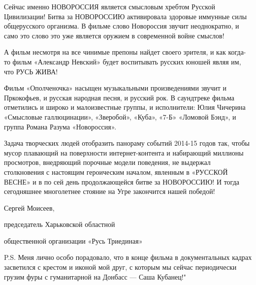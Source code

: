 Сейчас именно НОВОРОССИЯ является смысловым хребтом Русской Цивилизации! Битва
за НОВОРОССИЮ активировала здоровые иммунные силы общерусского организма. В
фильме слово Новороссия звучит неоднократно, и само это слово это уже является
оружием в современной войне смыслов! 

А фильм несмотря на все чинимые препоны найдет своего зрителя, и как когда-то
фильм «Александр Невский» будет воспитывать русских юношей являя им, что РУСЬ
ЖИВА! 

Фильм «Ополченочка» насыщен музыкальными произведениями звучит и Пркокофьев, и
русская народная песня, и русский рок. В саундтреке фильма отметились и широко
и малоизвестные группы, и исполнители: Юлия Чичерина «Смысловые галлюцинации»,
«Зверобой», «Куба», «7-Б» «Ломовой Бэнд», и группа Романа Разума «Новороссия». 

Задача творческих людей отобразить панораму событий 2014-15 годов так, чтобы
мусор плавающий на поверхности интернет-контента и набирающий миллионы
просмотров, внедряющий порочные модели поведения, не выдержал столкновения с
настоящим героическим началом, явленным в «РУССКОЙ ВЕСНЕ» и в по сей день
продолжающейся битве за НОВОРОССИЮ! И тогда сегодняшнее многолетнее стояние на
Угре закончится нашей победой! 

Сергей Моисеев, 

председатель Харьковской областной 

общественной организации «Русь Триединая» 

P.S. Меня лично особо порадовало, что в конце фильма в документальных кадрах
засветился с крестом и иконой мой друг, с которым мы сейчас периодически грузим
фуры с гуманитарной на Донбасс — Саша Кубанец!"

